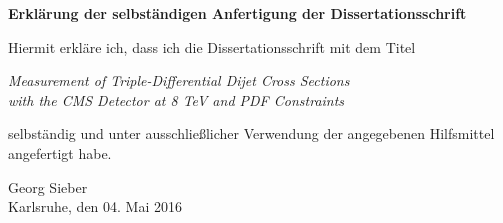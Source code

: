 \cleardoublepage
\thispagestyle{empty}
\null\vspace{10cm}
{\noindent\sffamily \textbf{Erklärung der selbständigen Anfertigung der
Dissertationsschrift}\hfill}
\vspace{1cm}

\noindent
Hiermit erkläre ich, dass ich die Dissertationsschrift mit dem Titel
%
\begin{center}
 \guillemotright
 \textit{Measurement of Triple-Differential Dijet Cross Sections\\
            with the CMS Detector at 8 TeV and PDF Constraints}\guillemotleft\\[1.5ex]

\end{center}
%
selbständig und unter ausschließlicher Verwendung der angegebenen Hilfsmittel\\
angefertigt habe.
\vspace{12ex}

\noindent
\hrulefill\hspace{9cm}

\noindent
Georg Sieber\\
\noindent
Karlsruhe, den 04. Mai 2016


